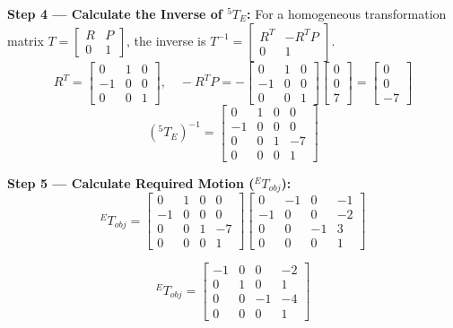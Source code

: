 \documentclass[12pt,a3paper]{article}
\begin{document}
\begin{enumerate}
\begin{tcolorbox}[enhanced,breakable,ansbox,colback=cB!4,colframe=cB,
  boxrule=0.8pt,arc=5pt,
  title={\textbf{Answer}},fonttitle=\bfseries\color{white},
  colbacktitle=cB]
\medskip
\textbf{Step 4 — Calculate the Inverse of ${}^5T_E$:}
For a homogeneous transformation matrix $T = \left[\begin{array}{c|c} R & P \\ \hline 0 & 1 \end{array}\right]$, the inverse is $T^{-1} = \left[\begin{array}{c|c} R^T & -R^T P \\ \hline 0 & 1 \end{array}\right]$.
\[
  R^T = \begin{bmatrix} 0 & 1 & 0 \\ -1 & 0 & 0 \\ 0 & 0 & 1 \end{bmatrix}, \quad
  -R^T P = -\begin{bmatrix} 0 & 1 & 0 \\ -1 & 0 & 0 \\ 0 & 0 & 1 \end{bmatrix} \begin{bmatrix} 0 \\ 0 \\ 7 \end{bmatrix} = \begin{bmatrix} 0 \\ 0 \\ -7 \end{bmatrix}
\]
\[
  ({}^5T_E)^{-1} = 
  \begin{bmatrix}
    0 & 1 & 0 & 0 \\
    -1 & 0 & 0 & 0 \\
    0 & 0 & 1 & -7 \\
    0 & 0 & 0 & 1
  \end{bmatrix}
\]

\medskip
\textbf{Step 5 — Calculate Required Motion (${}^ET_{obj}$):}
\[
  {}^ET_{obj} = 
  \begin{bmatrix}
    0 & 1 & 0 & 0 \\
    -1 & 0 & 0 & 0 \\
    0 & 0 & 1 & -7 \\
    0 & 0 & 0 & 1
  \end{bmatrix}
  \begin{bmatrix}
    0 & -1 & 0 & -1 \\
    -1 & 0 & 0 & -2 \\
    0 & 0 & -1 & 3 \\
    0 & 0 & 0 & 1
  \end{bmatrix}
\]

\[
  \boxed{{}^ET_{obj} =
  \begin{bmatrix}
    -1 & 0 & 0 & -2 \\
    0 & 1 & 0 & 1 \\
    0 & 0 & -1 & -4 \\
    0 & 0 & 0 & 1
  \end{bmatrix}}
\]


\end{tcolorbox}
\end{enumerate}
\end{document}
